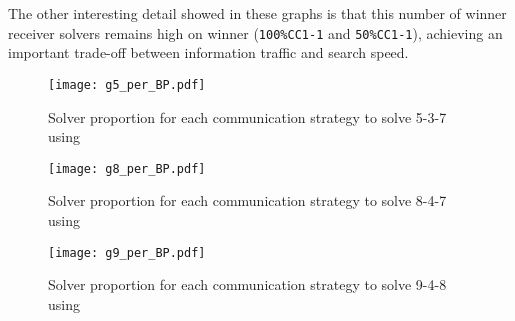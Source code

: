 The other interesting detail showed in these graphs is that this number of winner receiver solvers remains high on winner \commstrs{} (\texttt{100\%CC1-1} and \texttt{50\%CC1-1}), achieving an important trade-off between information traffic and search speed. 

\begin{figure}[!h]
\centering
\texttt{[image: g5\_per\_BP.pdf]}
\caption{Solver proportion for each communication strategy to solve \SGP{} 5-3-7 using \posl}\label{barplot:5}
\end{figure}

\begin{figure}[!h]
\centering
\texttt{[image: g8\_per\_BP.pdf]}
\caption{Solver proportion for each communication strategy to solve \SGP{} 8-4-7 using \posl}\label{barplot:8}
\end{figure}

\begin{figure}[!h]
\centering
\texttt{[image: g9\_per\_BP.pdf]}
\caption{Solver proportion for each communication strategy to solve \SGP{} 9-4-8 using \posl}\label{barplot:9}
\end{figure}